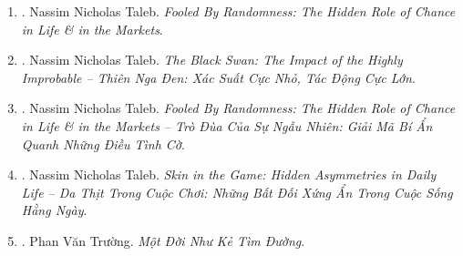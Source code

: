 \documentclass{article}
\begin{document}
\begin{enumerate}
	\item \cite{Taleb2008}. Nassim Nicholas Taleb. {\it Fooled By Randomness: The Hidden Role of Chance in Life \& in the Markets}.\hfill{\sf[reading]}
	\item \cite{Taleb_black_swan}. Nassim Nicholas Taleb. {\it The Black Swan: The Impact of the Highly Improbable -- Thiên Nga Đen: Xác Suất Cực Nhỏ, Tác Động Cực Lớn}.\hfill{\sf[reading]}
	\item \cite{Taleb_randomness}. Nassim Nicholas Taleb. {\it Fooled By Randomness: The Hidden Role of Chance in Life \& in the Markets -- Trò Đùa Của Sự Ngẫu Nhiên: Giải Mã Bí Ẩn Quanh Những Điều Tình Cờ}.\hfill{\sf[done]}
	\item \cite{Taleb_skin_game}. Nassim Nicholas Taleb. {\it Skin in the Game: Hidden Asymmetries in Daily Life -- Da Thịt Trong Cuộc Chơi: Những Bất Đối Xứng Ẩn Trong Cuộc Sống Hằng Ngày}.\hfill{\sf[reading]}
	\item \cite{Truong2023}. Phan Văn Trường. {\it Một Đời Như Kẻ Tìm Đường}.\hfill{\sf[done]}
\end{enumerate}


\printbibliography[heading=bibintoc]
	
\end{document}
